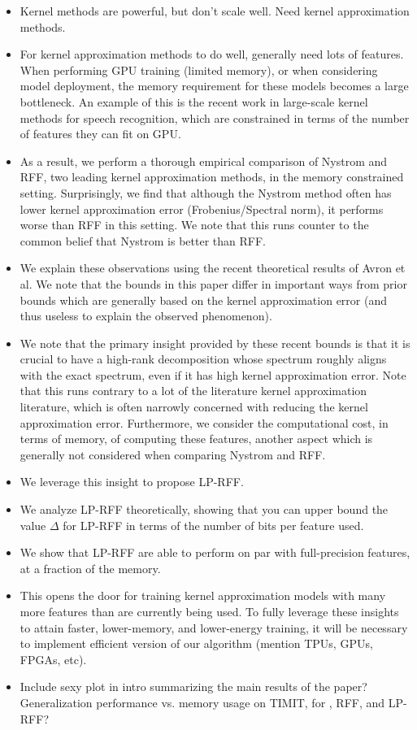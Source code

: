 \begin{itemize}
	\item Kernel methods are powerful, but don't scale well.  Need kernel approximation methods.
	\item For kernel approximation methods to do well, generally need lots of features.  When performing GPU training (limited memory), or when considering model deployment, the memory requirement for these models becomes a large bottleneck.  An example of this is the recent work in large-scale kernel methods for speech recognition, which are constrained in terms of the number of features they can fit on GPU.
	\item As a result, we perform a thorough empirical comparison of Nystrom and RFF, two leading kernel approximation methods, in the memory constrained setting.  Surprisingly, we find that although the Nystrom method often has lower kernel approximation error (Frobenius/Spectral norm), it performs worse than RFF in this setting.  We note that this runs counter to the common belief that Nystrom is better than RFF.
	\item We explain these observations using the recent theoretical results of Avron et al.  We note that the bounds in this paper differ in important ways from prior bounds which are generally based on the kernel approximation error (and thus useless to explain the observed phenomenon).
	\item We note that the primary insight provided by these recent bounds is that it is crucial to have a high-rank decomposition whose spectrum roughly aligns with the exact spectrum, even if it has high kernel approximation error.  Note that this runs contrary to a lot of the literature kernel approximation literature, which is often narrowly concerned with reducing the kernel approximation error.  Furthermore, we consider the computational cost, in terms of memory, of computing these features, another aspect which is generally not considered when comparing Nystrom and RFF.
	\item We leverage this insight to propose LP-RFF.
	\item We analyze LP-RFF theoretically, showing that you can upper bound the value $\Delta$ for LP-RFF in terms of the number of bits per feature used.
	\item We show that LP-RFF are able to perform on par with full-precision features, at a fraction of the memory.
	\item This opens the door for training kernel approximation models with many more features than are currently being used.  To fully leverage these insights to attain faster, lower-memory, and lower-energy training, it will be necessary to implement efficient version of our algorithm (mention TPUs, GPUs, FPGAs, etc). 
	\item Include sexy plot in intro summarizing the main results of the paper?  Generalization performance vs. memory usage on TIMIT, for \Nystrom, RFF, and LP-RFF?
\end{itemize}


